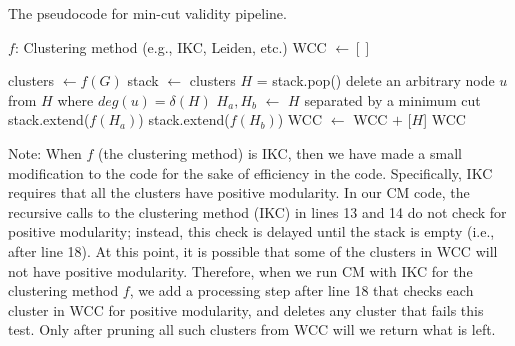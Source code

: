 \documentclass[12pt, oneside]{article}   	%
\begin{document}
\begin{algorithm}[h]
\caption{The pseudocode for min-cut validity pipeline.}
\begin{algorithmic}[2]
\State $f$: Clustering method (e.g., IKC, Leiden, etc.)
\State WCC $\gets []$ 

\State clusters $\gets f(G)$ 
\State stack $\gets$ clusters  
 
    \State $H$ = stack.pop()
    \State delete an arbitrary node $u$ from $H$ where $deg(u) = \delta(H)$ 
    \EndWhile
     
        \State $H_a, H_b$ $\gets$ $H$ separated by a minimum cut   
        \State stack.extend($f(H_a)$) 
        \State stack.extend($f(H_b)$)  
    \Else 
            \State WCC $\gets$ WCC $+$ [$H$] 
        \EndIf
\EndWhile
\State \Return WCC 
\EndFunction
\end{algorithmic}

\label{alg:full-pipeline}
\end{algorithm}

\clearpage
Note: When 
$f$ (the clustering method) is IKC, then we have made a small modification to the
code for the sake of efficiency in the code.  
Specifically, IKC requires that all the clusters have positive modularity.
 In our CM code, the recursive
calls to the clustering method (IKC) in lines 13 and 14 do not check for positive modularity; instead, this check is delayed until the stack is empty (i.e., after line 18).
At this point, it is possible that some of the clusters in WCC will not have positive modularity.
Therefore, when we run CM with IKC for the clustering method $f$,  we add a processing step after line 18 that checks each cluster in WCC for positive modularity,
and deletes any cluster that fails this test. 
Only after pruning all such clusters from WCC will we return what is left. 


\end{document}
